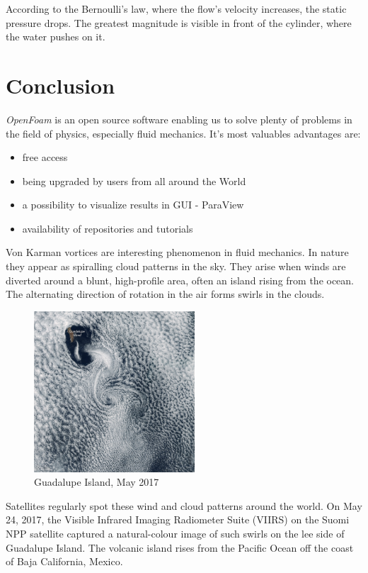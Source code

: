\documentclass[a4paper,11pt]{article}
\begin{document}
According to the Bernoulli’s law, where the flow's velocity increases, the static pressure drops. The greatest magnitude is visible in front of the cylinder, where the water pushes on it.

\section{Conclusion}

\emph{OpenFoam} is an open source software enabling us to solve plenty of problems in the field of physics, especially fluid mechanics. It's most valuables advantages are:

\begin{itemize}
  \item free access
  \item being upgraded by users from all around the World
  \item a possibility to visualize results in GUI - ParaView 
  \item availability of repositories and tutorials 
\end{itemize}

Von Karman vortices are interesting phenomenon in fluid mechanics. In nature they appear as spiralling cloud patterns in the sky. They arise when winds are diverted around a blunt, high-profile area, often an island rising from the ocean. The alternating direction of rotation in the air forms swirls in the clouds.

\begin{figure}[h]
\centering
\includegraphics[width=6cm]{guadalupe.JPG}
\caption{Guadalupe Island, May 2017}
\end{figure}

\newpage

Satellites regularly spot these wind and cloud patterns around the world. On May 24, 2017, the Visible Infrared Imaging Radiometer Suite (VIIRS) on the Suomi NPP satellite captured a natural-colour image of such swirls on the lee side of Guadalupe Island. The volcanic island rises from the Pacific Ocean off the coast of Baja California, Mexico.
\end{document}
